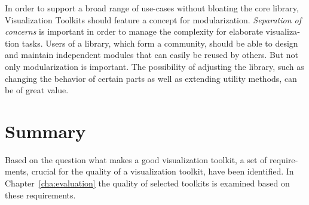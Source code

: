 \begin{english}
In order to support a broad range of use-cases without bloating the core library, Visualization Toolkits should feature a concept for modularization. \emph{Separation of concerns} is important in order to manage the complexity for elaborate visualization tasks. Users of a library, which form a community, should be able to design and maintain independent modules that can easily be reused by others. But not only modularization is important. The possibility of adjusting the library, such as changing the behavior of certain parts as well as extending utility methods, can be of great value.


\section{Summary}

Based on the question what makes a good visualization toolkit, a set of requirements, crucial for the quality of a visualization toolkit, have been identified. In Chapter~\ref{cha:evaluation} the quality of selected toolkits is examined based on these requirements.

\end{english}